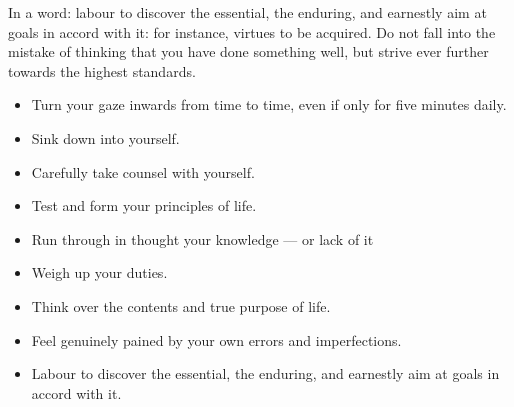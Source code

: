 In a word: labour to discover the essential, the enduring, and earnestly aim at goals in accord with it: for instance,
virtues to be acquired. Do not fall into the mistake of thinking that you have done something well, but strive ever
further towards the highest standards.

\begin{itemize}
\item Turn your gaze inwards from time to time, even if only for five minutes daily. 
\item Sink down into yourself. 
\item Carefully take counsel with yourself. 
\item Test and form your principles of life. 
\item Run through in thought your knowledge — or lack of it 
\item Weigh up your duties. 
\item Think over the contents and true purpose of life. 
\item Feel genuinely pained by your own errors and imperfections. 
\item Labour to discover the essential, the enduring, and earnestly aim at goals in accord with it. 
\end{itemize}

